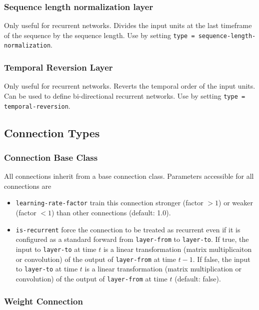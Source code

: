 \subsubsection*{Sequence length normalization layer}

Only useful for recurrent networks. Divides the input units at the last timeframe of the sequence by the sequence length. Use by setting \texttt{type = sequence-length-normalization}.

\subsubsection*{Temporal Reversion Layer}

Only useful for recurrent networks. Reverts the temporal order of the input units. Can be used to define bi-directional recurrent networks. Use by setting \texttt{type = temporal-reversion}.


\subsection{Connection Types}

\subsubsection*{Connection Base Class}

All connections inherit from a base connection class. Parameters accessible for all connections are
\begin{itemize}
    \item \texttt{learning-rate-factor} train this connection stronger (factor $ > 1 $) or weaker (factor $ < 1 $) than other connections (default: 1.0).
    \item \texttt{is-recurrent} force the connection to be treated as recurrent even if it is configured as a standard forward from \texttt{layer-from} to \texttt{layer-to}. If true, the input to \texttt{layer-to} at time $ t $ is a linear transformation (matrix multiplicaiton or convolution) of the output of \texttt{layer-from} at time $ t - 1 $. If false, the input to \texttt{layer-to} at time $ t $ is a linear transformation (matrix multiplication or convolution) of the output of \texttt{layer-from} at time $ t $ (default: false).
\end{itemize}

\subsubsection*{Weight Connection}

